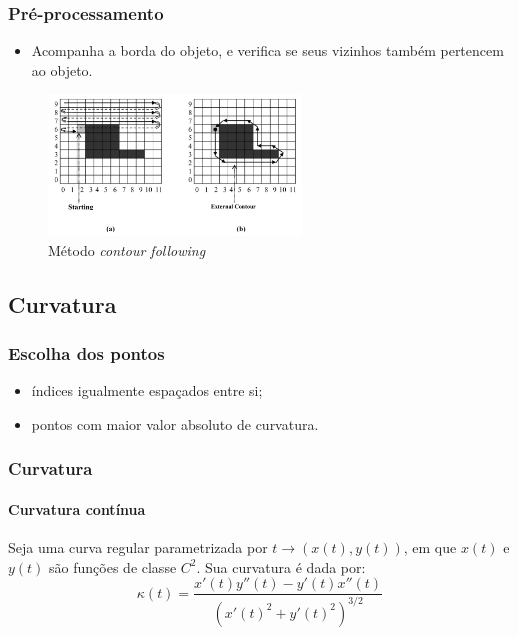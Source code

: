 \begin{frame}
\frametitle{Pré-processamento}

\begin{itemize}
	\item Acompanha a borda do objeto, e verifica se seus vizinhos também pertencem ao objeto.
\end{itemize}

\begin{figure}[hbt]
	\begin{center}
		\caption{Método \textit{contour following}~\cite{book_shape}}
		\includegraphics[width=0.6\textwidth]{img/contorno.png}
	\end{center}
\end{figure}
\end{frame}

\subsection{Curvatura}

\begin{frame}
\frametitle{Escolha dos pontos}

\begin{itemize}
\item {} índices igualmente espaçados entre si;
\medskip
\item {} pontos com maior valor absoluto de curvatura.
\end{itemize}

\end{frame}

\begin{frame}
\frametitle{Curvatura}
\framesubtitle{Curvatura contínua}

Seja uma curva regular parametrizada por $t \rightarrow (x(t), y(t))$, em que $x(t)$ e $y(t)$ são funções de classe $C^2$. Sua curvatura é dada por:
$$\kappa (t) = \frac{x'(t) y''(t) - y'(t) x''(t)}{(x'(t)^2 + y'(t)^2)^{3/2}}$$   

\end{frame}


